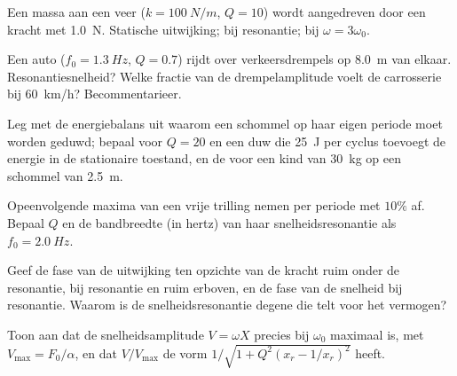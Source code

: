 \begin{exercise}[$\star$]\label{exo:b1:oscillators-resonance:4}
Een massa aan een veer ($k = \qty{100}{N/m}$, $Q = 10$) wordt aangedreven door een kracht
met  \qty{1.0}{N}. Statische uitwijking;  bij resonantie;
 bij $\omega = 3\omega_0$.
\end{exercise}

\begin{exercise}[$\star\star$]\label{exo:b1:oscillators-resonance:5}
Een auto ($f_0 = \qty{1.3}{Hz}$, $Q = 0.7$) rijdt over verkeersdrempels op \qty{8.0}{m}
van elkaar. Resonantiesnelheid? Welke fractie van de drempelamplitude voelt de
carrosserie bij \qty{60}{km/h}? Becommentarieer.
\end{exercise}

\begin{exercise}[$\star\star$]\label{exo:b1:oscillators-resonance:6}
Leg met de energiebalans uit waarom een schommel op haar eigen
periode moet worden geduwd; bepaal voor $Q = 20$ en een duw die \qty{25}{J} per cyclus toevoegt
de energie in de stationaire toestand, en de  voor een kind van \qty{30}{kg} op een
schommel van \qty{2.5}{m}.
\end{exercise}

\begin{exercise}[$\star\star$]\label{exo:b1:oscillators-resonance:7}
Opeenvolgende maxima van een vrije trilling nemen per periode met $10\%$ af.
Bepaal $Q$ en de bandbreedte (in hertz) van haar snelheidsresonantie als
$f_0 = \qty{2.0}{Hz}$.
\end{exercise}

\begin{exercise}[$\star\star$]\label{exo:b1:oscillators-resonance:8}
Geef de fase van de uitwijking ten opzichte van de kracht ruim onder de
resonantie, bij resonantie en ruim erboven, en de fase van de snelheid
bij resonantie. Waarom is de snelheidsresonantie degene die telt voor
het vermogen?
\end{exercise}

\begin{exercise}[$\star\star$]\label{exo:b1:oscillators-resonance:9}
Toon aan dat de snelheidsamplitude $V = \omega X$ precies bij $\omega_0$
maximaal is, met $V_{\max} = F_0/\alpha$, en dat $V/V_{\max}$ de
vorm $1/\sqrt{1 + Q^2(x_r - 1/x_r)^2}$ heeft.
\end{exercise}

